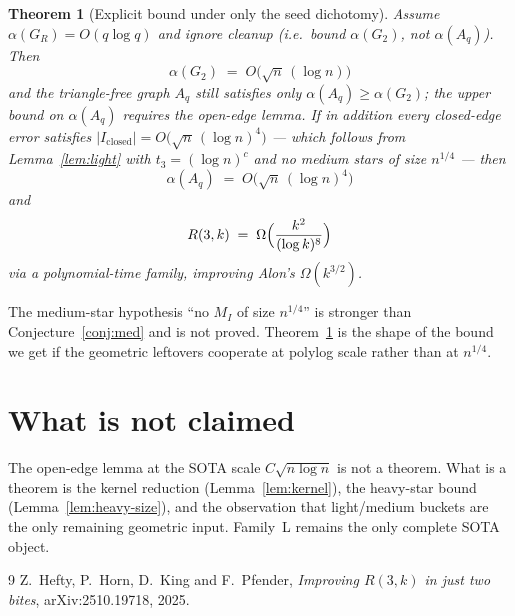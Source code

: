 \documentclass[11pt]{article}
\newtheorem{theorem}{Theorem}
\theoremstyle{definition}
\begin{document}
\begin{theorem}[Explicit bound under only the seed dichotomy]\label{thm:weak}
Assume $\alpha(G_R)=O(q\log q)$ and ignore cleanup (i.e.\ bound $\alpha(G_2)$, not $\alpha(A_q)$).
Then
\[
  \alpha(G_2)\;=\;O\bigl(\sqrt{n}\,(\log n)\bigr)
\]
and the triangle-free graph $A_q$ still satisfies only $\alpha(A_q)\ge\alpha(G_2)$; the upper bound on $\alpha(A_q)$ requires the open-edge lemma.
If in addition every closed-edge error satisfies $|I_{\mathrm{closed}}|=O\bigl(\sqrt{n}\,(\log n)^{4}\bigr)$ --- which follows from Lemma~\ref{lem:light} with $t_{3}=(\log n)^{c}$ and no medium stars of size $n^{1/4}$ --- then
\[
  \alpha(A_q)\;=\;O\bigl(\sqrt{n}\,(\log n)^{4}\bigr)
\]
and
\[
  R(3,k)\;=\;\Omega\Bigl(\frac{k^{2}}{(\log k)^{8}}\Bigr)
\]
via a polynomial-time family, improving Alon's $\Omega(k^{3/2})$.
\end{theorem}

The medium-star hypothesis ``no $M_I$ of size $n^{1/4}$'' is stronger than Conjecture~\ref{conj:med} and is not proved.
Theorem~\ref{thm:weak} is the shape of the bound we get if the geometric leftovers cooperate at polylog scale rather than at $n^{1/4}$.

\section{What is not claimed}

The open-edge lemma at the SOTA scale $C\sqrt{n\log n}$ is not a theorem.
What is a theorem is the kernel reduction (Lemma~\ref{lem:kernel}), the heavy-star bound (Lemma~\ref{lem:heavy-size}), and the observation that light/medium buckets are the only remaining geometric input.
Family~L remains the only complete SOTA object.

\begin{thebibliography}{9}
Z.~Hefty, P.~Horn, D.~King and F.~Pfender,
\emph{Improving $R(3,k)$ in just two bites},
arXiv:2510.19718, 2025.
\end{thebibliography}
\end{document}
